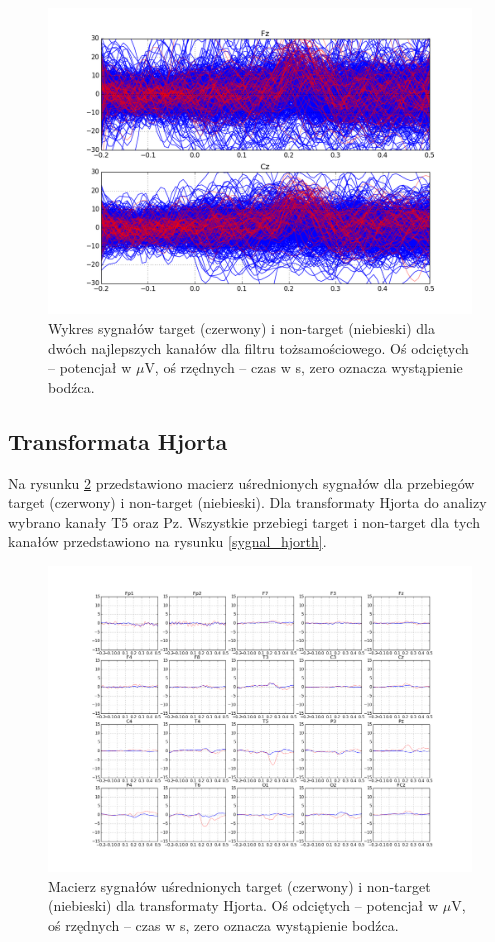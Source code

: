 \documentclass[licencjacka,openright]{pracamgr}
\begin{document}
\begin{figure}
\centering
\includegraphics[scale=0.55, trim=10mm 15mm 10mm 15mm, clip=True]{pics/sygnal_toz.png}
\caption{Wykres sygnałów target (czerwony) i non-target (niebieski) dla dwóch najlepszych kanałów dla filtru tożsamościowego. Oś odciętych -- potencjał w  $\mu$V, oś rzędnych -- czas w s, zero oznacza wystąpienie bodźca.}
\label{sygnal_toz}
\end{figure}

\subsection{Transformata Hjorta}

Na rysunku \ref{macierz_hjorth} przedstawiono macierz uśrednionych sygnałów dla przebiegów target (czerwony) i non-target (niebieski). Dla transformaty Hjorta do analizy wybrano kanały T5 oraz Pz. Wszystkie przebiegi target i non-target dla tych kanałów przedstawiono na rysunku \ref{sygnal_hjorth}.

\begin{figure}
\centering
\includegraphics[scale=0.35, trim=10mm 25mm 10mm 25mm, clip=True]{pics/macierz_hjorth.png}
\caption{Macierz sygnałów uśrednionych target (czerwony) i non-target (niebieski) dla transformaty Hjorta. Oś odciętych -- potencjał w  $\mu$V, oś rzędnych -- czas w s, zero oznacza wystąpienie bodźca.}
\label{macierz_hjorth}
\end{figure}
\end{document}
